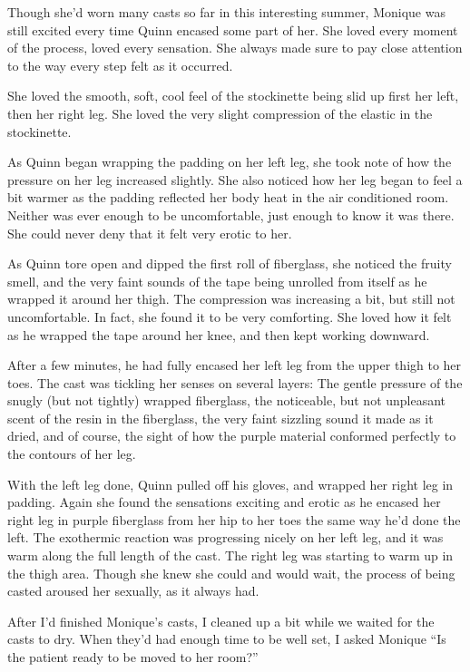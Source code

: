 \begin{thought}
Though she'd worn many casts so far in this interesting summer, Monique was still excited
every time Quinn encased some part of her. She loved every moment of the process, loved every
sensation. She always made sure to pay close attention to the way every step felt as it
occurred.

She loved the smooth, soft, cool feel of the stockinette being slid up first her left, then
her right leg. She loved the very slight compression of the elastic in the stockinette.

As Quinn began wrapping the padding on her left leg, she took note of how the pressure on
her leg increased slightly. She also noticed how her leg began to feel a bit warmer as the
padding reflected her body heat in the air conditioned room. Neither was ever enough to be
uncomfortable, just enough to know it was there. She could never deny that it felt very erotic
to her.

As Quinn tore open and dipped the first roll of fiberglass, she noticed the fruity smell,
and the very faint sounds of the tape being unrolled from itself as he wrapped it around her
thigh. The compression was increasing a bit, but still not uncomfortable. In fact, she found it
to be very comforting. She loved how it felt as he wrapped the tape around her knee, and then
kept working downward.

After a few minutes, he had fully encased her left leg from the upper thigh to her toes.
The cast was tickling her senses on several layers: The gentle pressure of the snugly (but not
tightly) wrapped fiberglass, the noticeable, but not unpleasant scent of the resin in the
fiberglass, the very faint sizzling sound it made as it dried, and of course, the sight of how
the purple material conformed perfectly to the contours of her leg.

With the left leg done, Quinn pulled off his gloves, and wrapped her right leg in padding.
Again she found the sensations exciting and erotic as he encased her right leg in purple
fiberglass from her hip to her toes the same way he'd done the left. The exothermic reaction was
progressing nicely on her left leg, and it was warm along the full length of the cast. The right
leg was starting to warm up in the thigh area. Though she knew she could and would wait, the
process of being casted aroused her sexually, as it always had.
\end{thought}

After I'd finished Monique's casts, I cleaned up a bit while we waited for the casts to
dry. When they'd had enough time to be well set, I asked Monique ``Is the patient ready to be
moved to her room?''

